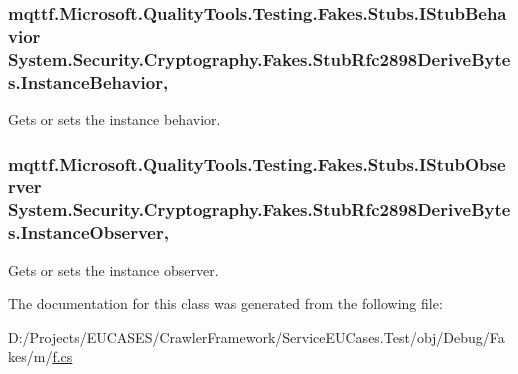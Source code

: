 \hypertarget{class_system_1_1_security_1_1_cryptography_1_1_fakes_1_1_stub_rfc2898_derive_bytes_affe52e8c35c7d9075b3342fa63888ed0}{
\subsubsection[{Instance\-Behavior}]{\setlength{\rightskip}{0pt plus 5cm}mqttf.\-Microsoft.\-Quality\-Tools.\-Testing.\-Fakes.\-Stubs.\-I\-Stub\-Behavior System.\-Security.\-Cryptography.\-Fakes.\-Stub\-Rfc2898\-Derive\-Bytes.\-Instance\-Behavior\hspace{0.3cm}{\ttfamily [get]}, {\ttfamily [set]}}}\label{class_system_1_1_security_1_1_cryptography_1_1_fakes_1_1_stub_rfc2898_derive_bytes_affe52e8c35c7d9075b3342fa63888ed0}


Gets or sets the instance behavior.

\hypertarget{class_system_1_1_security_1_1_cryptography_1_1_fakes_1_1_stub_rfc2898_derive_bytes_a8858032aa910f36952ed16946ec838a0}{
\subsubsection[{Instance\-Observer}]{\setlength{\rightskip}{0pt plus 5cm}mqttf.\-Microsoft.\-Quality\-Tools.\-Testing.\-Fakes.\-Stubs.\-I\-Stub\-Observer System.\-Security.\-Cryptography.\-Fakes.\-Stub\-Rfc2898\-Derive\-Bytes.\-Instance\-Observer\hspace{0.3cm}{\ttfamily [get]}, {\ttfamily [set]}}}\label{class_system_1_1_security_1_1_cryptography_1_1_fakes_1_1_stub_rfc2898_derive_bytes_a8858032aa910f36952ed16946ec838a0}


Gets or sets the instance observer.



The documentation for this class was generated from the following file\-:\begin{DoxyCompactItemize}
\item 
D\-:/\-Projects/\-E\-U\-C\-A\-S\-E\-S/\-Crawler\-Framework/\-Service\-E\-U\-Cases.\-Test/obj/\-Debug/\-Fakes/m/\hyperlink{m_2f_8cs}{f.\-cs}\end{DoxyCompactItemize}
